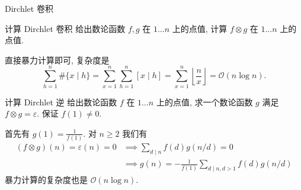 \documentclass{beamer}
\begin{document}
    \begin{frame}{Dirchlet 卷积}
        \begin{block}{计算 Dirchlet 卷积}
            给出数论函数 $f,g$ 在 $1\dots n$ 上的点值, 计算 $f\otimes g$ 在 $1\dots n$ 上的点值.
        \end{block}
        \pause
        直接暴力计算即可, 复杂度是
        $$
        \sum_{h=1}^n\#\{x\mid h\}=\sum_{x=1}^n\sum_{h=1}^n[x\mid h]=\sum_{x=1}^n\left\lfloor\frac nx\right\rfloor=\mathcal O(n\log n).
        $$
        \pause
        \begin{block}{计算 Dirchlet 逆}
            给出数论函数 $f$ 在 $1\dots n$ 上的点值, 求一个数论函数 $g$ 满足 $f\otimes g=\varepsilon$. 保证 $f(1)\neq 0$.
        \end{block}
        \pause
        首先有 $g(1)=\frac 1{f(1)}$. 对 $n\geq 2$ 我们有
        \begin{align*}
            (f\otimes g)(n)=\varepsilon(n)=0&\implies\sum_{d\mid n}f(d)g(n/d)=0\\
            &\implies g(n)=-\frac 1{f(1)}\sum_{d\mid n,d>1}f(d)g(n/d)
        \end{align*}
        暴力计算的复杂度也是 $\mathcal O(n\log n)$.
    \end{frame}
\end{document}
